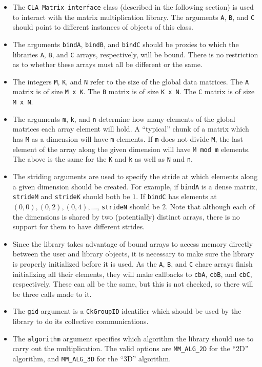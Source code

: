 \begin{itemize}

\item The {\tt CLA\_Matrix\_interface} class (described in the following
section) is used to interact with the matrix multiplication library. The
arguments {\tt A}, {\tt B}, and {\tt C} should point to different instances
of objects of this class.

\item The arguments {\tt bindA}, {\tt bindB}, and {\tt bindC} should be proxies
to which the libraries {\tt A}, {\tt B}, and {\tt C} arrays, respectively, will
be bound. There is no restriction as to whether these arrays must all be
different or the same.

\item The integers {\tt M}, {\tt K}, and {\tt N} refer to the size of the
global data matrices. The {\tt A} matrix is of size {\tt M x K}. The {\tt B}
matrix is of size {\tt K x N}. The {\tt C} matrix is of size {\tt M x N}.

\item The arguments {\tt m}, {\tt k}, and {\tt n} determine how many elements
of the global matrices each array element will hold. A ``typical'' chunk of
a matrix which has {\tt M} as a dimension will have {\tt m} elements. If
{\tt m} does not divide {\tt M}, the last element of the array along the given
dimension will have {\tt M mod m} elements. The above is the same for the
{\tt K} and {\tt k} as well as {\tt N} and {\tt n}.

\item The striding arguments are used to specify the stride at which elements
along a given dimension should be created. For example, if {\tt bindA} is a
dense matrix, {\tt strideM} and {\tt strideK} should both be $1$. If {\tt bindC}
has elements at $(0, 0), (0, 2), (0, 4), \ldots$, {\tt strideN} should be $2$.
Note that although each of the dimensions is shared by two (potentially)
distinct arrays, there is no support for them to have different strides.

\item Since the library takes advantage of bound arrays to access memory
directly between the user and library objects, it is necessary to make sure
the library is properly initialized before it is used. As the {\tt A}, {\tt B},
and {\tt C} chare arrays finish initializing all their elements, they will
make callbacks to {\tt cbA}, {\tt cbB}, and {\tt cbC}, respectively. These
can all be the same, but this is not checked, so there will be three calls made
to it.

\item The {\tt gid} argument is a {\tt CkGroupID} identifier which should be
used by the library to do its collective communications.

\item The {\tt algorithm} argument specifies which algorithm the library should
use to carry out the multiplication. The valid options are {\tt MM\_ALG\_2D}
for the ``2D'' algorithm, and {\tt MM\_ALG\_3D} for the ``3D'' algorithm.

\end{itemize}

